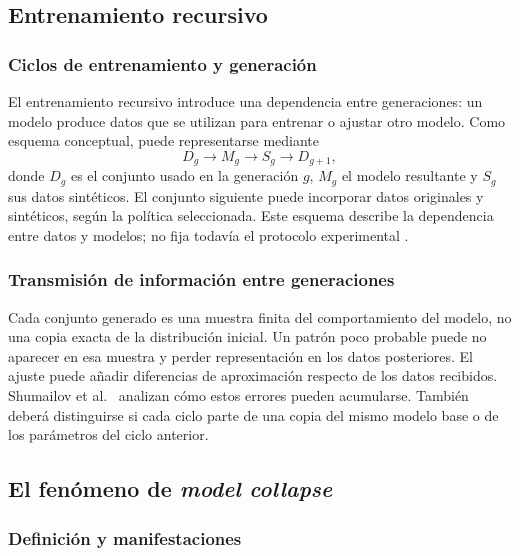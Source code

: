 \documentclass[12pt,letterpaper]{article}
\begin{document}
\subsection{Entrenamiento recursivo}

\subsubsection{Ciclos de entrenamiento y generación}

El entrenamiento recursivo introduce una dependencia entre generaciones:
un modelo produce datos que se utilizan para entrenar o ajustar otro modelo.
Como esquema conceptual, puede representarse mediante
\begin{equation}
    D_g \longrightarrow M_g \longrightarrow S_g
    \longrightarrow D_{g+1},
\end{equation}
donde \(D_g\) es el conjunto usado en la generación \(g\), \(M_g\) el modelo
resultante y \(S_g\) sus datos sintéticos. El conjunto siguiente puede
incorporar datos originales y sintéticos, según la política seleccionada.
Este esquema describe la dependencia entre datos y modelos; no fija todavía
el protocolo experimental \cite{shumailov2024,kazdan2025}.

\subsubsection{Transmisión de información entre generaciones}

Cada conjunto generado es una muestra finita del comportamiento del modelo,
no una copia exacta de la distribución inicial. Un patrón poco probable
puede no aparecer en esa muestra y perder representación en los datos
posteriores. El ajuste puede añadir diferencias de aproximación respecto
de los datos recibidos. Shumailov et al.\ \cite{shumailov2024} analizan cómo
estos errores pueden acumularse. También deberá distinguirse si cada ciclo
parte de una copia del mismo modelo base o de los parámetros del ciclo
anterior.

\subsection{El fenómeno de \textit{model collapse}}

\subsubsection{Definición y manifestaciones}
\end{document}
